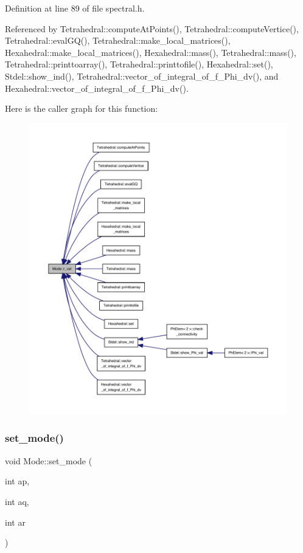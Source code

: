 Definition at line 89 of file spectral.\+h.



Referenced by Tetrahedral\+::compute\+At\+Points(), Tetrahedral\+::compute\+Vertice(), Tetrahedral\+::eval\+G\+Q(), Tetrahedral\+::make\+\_\+local\+\_\+matrices(), Hexahedral\+::make\+\_\+local\+\_\+matrices(), Hexahedral\+::mass(), Tetrahedral\+::mass(), Tetrahedral\+::printtoarray(), Tetrahedral\+::printtofile(), Hexahedral\+::set(), Stdel\+::show\+\_\+ind(), Tetrahedral\+::vector\+\_\+of\+\_\+integral\+\_\+of\+\_\+f\+\_\+\+Phi\+\_\+dv(), and Hexahedral\+::vector\+\_\+of\+\_\+integral\+\_\+of\+\_\+f\+\_\+\+Phi\+\_\+dv().

Here is the caller graph for this function\+:
\nopagebreak
\begin{figure}[H]
\begin{center}
\leavevmode
\includegraphics[width=350pt]{classMode_aa9c1bb027a3ba5c83f08dcd936aced32_icgraph}
\end{center}
\end{figure}
\mbox{\label{classMode_a463a9d97e170c258eeb1ea70b7b7a405}} 
\subsubsection{\texorpdfstring{set\+\_\+mode()}{set\_mode()}}
{\footnotesize\ttfamily void Mode\+::set\+\_\+mode (\begin{DoxyParamCaption}\item[{int}]{ap,  }\item[{int}]{aq,  }\item[{int}]{ar }\end{DoxyParamCaption})\hspace{0.3cm}{\ttfamily [inline]}}



